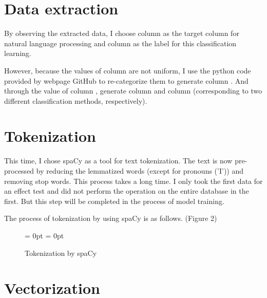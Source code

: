 \documentclass[12pt]{article}
\begin{document}
\section{Data extraction} 

By observing the extracted data, I choose column  as the target column for natural language processing and column  as the label for this classification learning.

However, because the values of column are not uniform, I use the python code provided by webpage GitHub to re-categorize them to generate column . And through the value of column , generate column  and column  (corresponding to two different classification methods, respectively).

\section{Tokenization}

This time,  I chose spaCy as a tool for text tokenization. The text is now pre-processed by reducing the lemmatized words (except for pronouns ('I')) and removing stop words. This process takes a long time. I only took the first data for an effect test and did not perform the operation on the entire database in the first. But this step will be completed in the process of model training.

The process of tokenization by using spaCy is as follows. (Figure 2)

\begin{figure}[hbtp]
	\centering \fboxrule = 0pt \fboxsep = 0pt 
	\caption{Tokenization by spaCy}
\end{figure}

\section{Vectorization}
\end{document}
